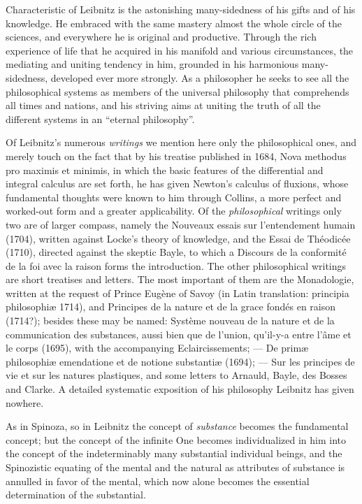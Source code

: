 Characteristic of Leibnitz is the astonishing many-sidedness of his
gifts and of his knowledge. He embraced with the same mastery almost the
whole circle of the sciences, and everywhere he is original and
productive. Through the rich experience of life that he acquired in his
manifold and various circumstances, the mediating and uniting tendency
in him, grounded in his harmonious many-sidedness, developed ever more
strongly. As a philosopher he seeks to see all the philosophical systems
as members of the universal philosophy that comprehends all times and
nations, and his striving aims at uniting the truth of all the different
systems in an ``eternal philosophy''.

Of Leibnitz's numerous \emph{writings} we mention here only the
philosophical ones, and merely touch on the fact that by his treatise
published in 1684, Nova methodus pro maximis et minimis, in which the
basic features of the differential and integral calculus are set forth,
he has given Newton's calculus of fluxions, whose fundamental
thoughts were known to him through Collins, a more perfect
and worked-out form and a greater applicability. Of the
\emph{philosophical} writings only two are of larger compass, namely the
Nouveaux essais sur l'entendement humain (1704), written against Locke's
theory of knowledge, and the Essai de Théodicée (1710), directed against
the skeptic Bayle, to which a Discours de la conformité de la foi avec
la raison forms the introduction. The other philosophical writings are
short treatises and letters. The most important of them are the
Monadologie, written at the request of Prince Eugène of Savoy (in Latin
translation: principia philosophiæ 1714), and Principes de la nature et
de la grace fondés en raison (1714?); besides these may be named:
Système nouveau de la nature et de la communication des substances,
aussi bien que de l'union, qu'il-y-a entre l'âme et le corps (1695),
with the accompanying Eclaircissements; --- De primæ philosophiæ
emendatione et de notione substantiæ (1694); --- Sur les principes de
vie et sur les natures plastiques, and some letters to Arnauld, Bayle,
des Bosses and Clarke. A detailed systematic exposition of his
philosophy Leibnitz has given nowhere.

\divrule

As in Spinoza, so in Leibnitz the concept of \emph{substance} becomes
the fundamental concept; but the concept of the infinite One becomes
individualized in him into the concept of the indeterminably many
substantial individual beings, and the Spinozistic equating of the
mental and the natural as attributes of substance is annulled in favor
of the mental, which now alone becomes the essential determination of
the substantial.

